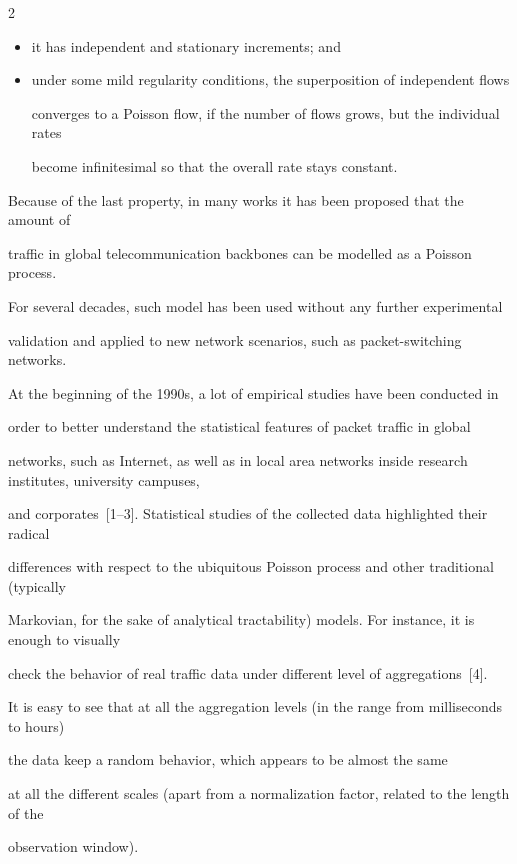 \begin{multicols}{2}
\begin{itemize}
\item it has independent and stationary increments; and

\item under some mild regularity conditions, the superposition of independent flows 

converges to a Poisson flow, if the number of flows grows, but the individual rates 

become infinitesimal so that the overall rate stays constant. 

\end{itemize}



Because of the last property, in many works it has been proposed that the amount of 

traffic in global telecommunication backbones can be modelled as a Poisson process. 

For several decades, such model has been used without any further experimental 

validation and applied to new network scenarios, such as packet-switching networks.



At the beginning of the 1990s, a lot of empirical studies have been conducted in 

order to better understand the statistical features of packet traffic in global 

networks, such as Internet, as well as in local area networks inside research institutes, university campuses, 

and corporates~[1--3]. Statistical studies of the collected data highlighted their radical 

differences with respect to the ubiquitous Poisson process and other traditional (typically 

Markovian, for the sake of analytical tractability) models.  For instance, it is enough to visually 

check the behavior of real traffic data under different level of aggregations~[4]. 

It is easy to see that at all the aggregation levels (in the range from milliseconds to hours) 

the data keep a random behavior, which appears to be almost the same 

at all the different scales (apart from a normalization factor, related to the length of the 

observation window).




\end{multicols}
